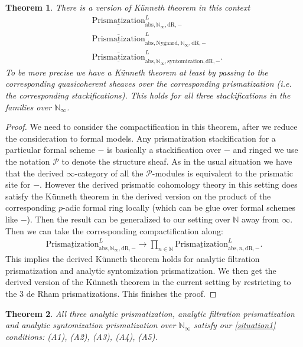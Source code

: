 \documentclass[12pt]{article}
\newtheorem{theorem}{Theorem}
\theoremstyle{definition}
\begin{document}
\begin{theorem}
There is a version of K\"unneth theorem in this context
\begin{align}
&\underline{\mathrm{Prismatization}}^L_{\mathrm{abs},\mathbb{N}_\infty,\mathrm{dR},-}\\
&\overline{\underline{\mathrm{Prismatization}}}^L_{\mathrm{abs},\mathrm{Nygaard},\mathbb{N}_\infty,\mathrm{dR},-}\\
&\overline{\underline{\mathrm{Prismatization}}}^L_{\mathrm{abs},\mathbb{N}_\infty,\mathrm{syntomization},\mathrm{dR},-}.
\end{align}
To be more precise we have a K\"unneth theorem at least by passing to the corresponding quasicoherent sheaves over the corresponding prismatization (i.e. the corresponding stackifications). This holds for all three stackifications in the families over $\mathbb{N}_\infty$. 
\end{theorem}

\begin{proof}
We need to consider the compactification in this theorem, after we reduce the consideration to formal models. Any prismatization stackification for a particular formal scheme $-$ is basically a stackification over $-$ and ringed we use the notation $\mathcal{P}$ to denote the structure sheaf. As in the usual situation we have that the derived $\infty$-category of all the $\mathcal{P}$-modules is equivalent to the prismatic site for $-$. However the derived prismatic cohomology theory in this setting does satisfy the K\"unneth theorem in the derived version on the product of the corresponding $p$-adic formal ring locally (which can be glue over formal schemes like $-$). Then the result can be generalized to our setting over $\mathbb{N}$ away from $\infty$. Then we can take the corresponding compactification along:
\begin{align}
{\underline{\mathrm{Prismatization}}}^L_{\mathrm{abs},\mathbb{N}_\infty,\mathrm{dR},-}\rightarrow  \prod_{n\in \mathbb{N}} {\underline{\mathrm{Prismatization}}}^L_{\mathrm{abs},n,\mathrm{dR},-}.
\end{align}
This implies the derived K\"unneth theorem holds for analytic filtration prismatization and analytic syntomization prismatization. We then get the derived version of the K\"unneth theorem in the current setting by restricting to the 3 de Rham prismatizations. This finishes the proof.
\end{proof}

\begin{theorem}
All three analytic prismatization, analytic filtration prismatization and analytic syntomization prismatization over $\mathbb{N}_\infty$ satisfy our \cref{situation1} conditions: (A1), (A2), (A3), (A4), (A5).
\end{theorem}
\end{document}
